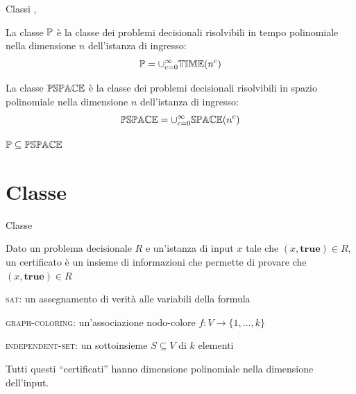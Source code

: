 \begin{frame}{Classi \PTIME, \PSPACE}

\vspace{-9pt}
\begin{myboxtitle}
La \alert{classe $\mbox{\sc $\mathbb{P}$}$} è la classe dei problemi decisionali risolvibili
in tempo polinomiale nella dimensione $n$ dell'istanza di ingresso:
\[
  \mbox{\sc $\mathbb{P}$} = \cup_{c=0}^{\infty} \mbox{$\mathbb{TIME}$}(n^c)
\]
\end{myboxtitle}

\begin{myboxtitle}
La \alert{classe $\mbox{$\mathbb{PSPACE}$}$} è la classe dei problemi decisionali risolvibili
in spazio polinomiale nella dimensione $n$ dell'istanza di ingresso:
\[
  \mbox{$\mathbb{PSPACE}$} = \cup_{c=0}^{\infty} \mbox{$\mathbb{SPACE}$}(n^c)
\]
\end{myboxtitle}

\begin{myboxtitle}[Note]
$\mbox{\sc $\mathbb{P}$} \subseteq \mbox{$\mathbb{PSPACE}$}$
\end{myboxtitle}

\end{frame}

\section{Classe \NP}
\begin{frame}{Classe \NP}

\vspace{-9pt}
\begin{myboxtitle}[Certificato]
Dato un problema decisionale $R$ e un'istanza di input $x$ tale
che $(x, \mathbf{true}) \in R$, un \alert{certificato} è un insieme di informazioni che permette di provare che $(x, \mathbf{true}) \in R$
\end{myboxtitle}

\begin{myboxtitle}[Esempi]
\BIL
\item \textsc{sat}: un assegnamento di verità alle variabili 
  della formula
\item \textsc{graph-coloring}: un'associazione nodo-colore $f: V \rightarrow \{ 1, \ldots, k \}$  
\item \textsc{independent-set}: un sottoinsieme $S \subseteq V$ di $k$ elementi
\EIL

\medskip
Tutti questi ``certificati'' hanno dimensione polinomiale nella dimensione dell'input.
\end{myboxtitle}

\end{frame}

